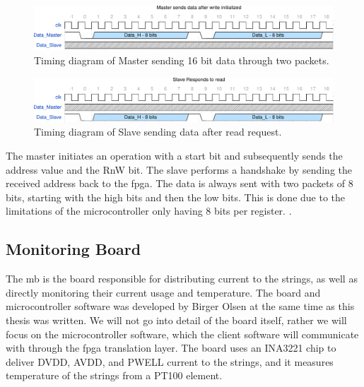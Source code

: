 \documentclass[main.tex]{subfiles}
\begin{document}
\begin{figure}[!htpb]
    \centering
    \includegraphics[width=18cm, scale=1]{images/MasterSendData-eps-converted-to.pdf}
    \caption{Timing diagram of Master sending 16 bit data through two packets.}
    \label{fig: master_send}
\end{figure}
\FloatBarrier

\begin{figure}[!htpb]
    \centering
    \includegraphics[width=18cm, scale=1]{images/SlaveRespondRead-eps-converted-to.pdf}
    \caption{Timing diagram of Slave sending data after read request.}
    \label{fig: slave_read}
\end{figure}
\FloatBarrier

The master initiates an operation with a start bit and subsequently sends the address value and the RnW bit. The slave performs a handshake by sending the received address back to the \gls{fpga}. The data is always sent with two packets of 8 bits, starting with the high bits and then the low bits. This is done due to the limitations of the microcontroller only having 8 bits per register. .



\subsection{Monitoring Board}
\label{ssec: microcontroller}
The \acrlong{mb} is the board responsible for distributing current to the strings, as well as directly monitoring their current usage and temperature. The board and microcontroller software was developed by Birger Olsen at the same time as this thesis was written. We will not go into detail of the board itself, rather we will focus on the microcontroller software, which the client software will communicate with through the \gls{fpga} translation layer. The board uses an INA3221 chip to deliver DVDD, AVDD, and PWELL current to the strings, and it measures temperature of the strings from a PT100 element.
\end{document}
